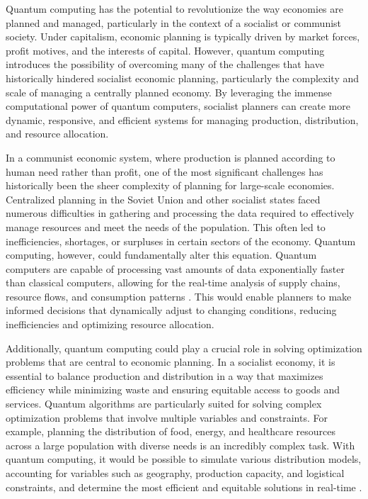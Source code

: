 \begin{refsection}
Quantum computing has the potential to revolutionize the way economies are planned and managed, particularly in the context of a socialist or communist society. Under capitalism, economic planning is typically driven by market forces, profit motives, and the interests of capital. However, quantum computing introduces the possibility of overcoming many of the challenges that have historically hindered socialist economic planning, particularly the complexity and scale of managing a centrally planned economy. By leveraging the immense computational power of quantum computers, socialist planners can create more dynamic, responsive, and efficient systems for managing production, distribution, and resource allocation.

In a communist economic system, where production is planned according to human need rather than profit, one of the most significant challenges has historically been the sheer complexity of planning for large-scale economies. Centralized planning in the Soviet Union and other socialist states faced numerous difficulties in gathering and processing the data required to effectively manage resources and meet the needs of the population. This often led to inefficiencies, shortages, or surpluses in certain sectors of the economy. Quantum computing, however, could fundamentally alter this equation. Quantum computers are capable of processing vast amounts of data exponentially faster than classical computers, allowing for the real-time analysis of supply chains, resource flows, and consumption patterns \cite[pp.~115-120]{nielsen_quantum_computing}. This would enable planners to make informed decisions that dynamically adjust to changing conditions, reducing inefficiencies and optimizing resource allocation.

Additionally, quantum computing could play a crucial role in solving optimization problems that are central to economic planning. In a socialist economy, it is essential to balance production and distribution in a way that maximizes efficiency while minimizing waste and ensuring equitable access to goods and services. Quantum algorithms are particularly suited for solving complex optimization problems that involve multiple variables and constraints. For example, planning the distribution of food, energy, and healthcare resources across a large population with diverse needs is an incredibly complex task. With quantum computing, it would be possible to simulate various distribution models, accounting for variables such as geography, production capacity, and logistical constraints, and determine the most efficient and equitable solutions in real-time \cite[pp.~300-305]{farhi_quantum_algorithms}.


\end{refsection}
